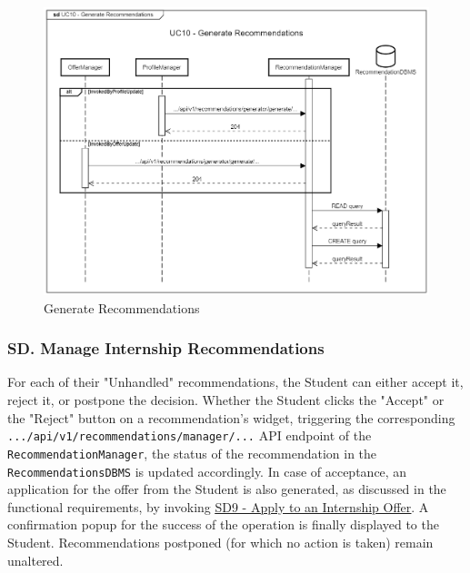 \begin{figure}[H]
    \begin{center}
         \includegraphics[width=1\linewidth]{LaTeXCode/images/SequenceDiagrams/UC10-sequenceDiagram.png}
         \caption{Generate Recommendations}
         \label{fig:generate_recommendations_sd}
     \end{center}
\end{figure}

\newpage

\subsubsection*{SD\cuc. Manage Internship Recommendations}
\label{subsubsec:manage_internship_recommendations_sd}
For each of their "Unhandled" recommendations, the Student can either accept it, reject it, or postpone the decision. Whether the Student clicks the "Accept" or the "Reject" button on a recommendation's widget, triggering the corresponding \texttt{.../api/v1/recommendations/manager/...} API endpoint of the \texttt{RecommendationManager}, the status of the recommendation in the \\ \texttt{RecommendationsDBMS} is updated accordingly. In case of acceptance, an application for the offer from the Student is also generated, as discussed in the functional requirements, by invoking \hyperref[fig:apply_to_internships_sd]{\protect\uline{SD9 - Apply to an Internship Offer}}. A confirmation popup for the success of the operation is finally displayed to the Student. Recommendations postponed (for which no action is taken) remain unaltered.

